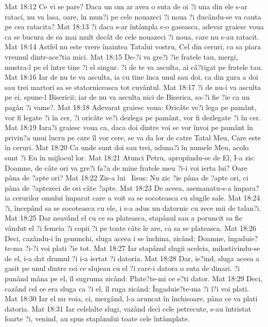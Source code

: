 Mat 18:12  Ce vi se pare? Daca un om ar avea o suta de oi ?i una din ele s-ar rataci, nu va lasa, oare, în mun?i pe cele nouazeci ?i noua ?i ducându-se va cauta pe cea ratacita?
Mat 18:13  ?i daca s-ar întâmpla s-o gaseasca, adevar graiesc voua ca se bucura de ea mai mult decât de cele nouazeci ?i noua, care nu s-au ratacit.
Mat 18:14  Astfel nu este vrere înaintea Tatalui vostru, Cel din ceruri, ca sa piara vreunul dintr-ace?tia mici.
Mat 18:15  De-?i va gre?i ?ie fratele tau, mergi, mustra-l pe el între tine ?i el singur. ?i de te va asculta, ai câ?tigat pe fratele tau.
Mat 18:16  Iar de nu te va asculta, ia cu tine înca unul sau doi, ca din gura a doi sau trei martori sa se statorniceasca tot cuvântul.
Mat 18:17  ?i de nu-i va asculta pe ei, spune-l Bisericii; iar de nu va asculta nici de Biserica, sa-?i fie ?ie ca un pagân ?i vame?.
Mat 18:18  Adevarat graiesc voua: Oricâte ve?i lega pe pamânt, vor fi legate ?i în cer, ?i oricâte ve?i dezlega pe pamânt, vor fi dezlegate ?i în cer.
Mat 18:19  Iara?i graiesc voua ca, daca doi dintre voi se vor învoi pe pamânt în privin?a unui lucru pe care îl vor cere, se va da lor de catre Tatal Meu, Care este în ceruri.
Mat 18:20  Ca unde sunt doi sau trei, aduna?i în numele Meu, acolo sunt ?i Eu în mijlocul lor.
Mat 18:21  Atunci Petru, apropiindu-se de El, I-a zis: Doamne, de câte ori va gre?i fa?a de mine fratele meu ?i-i voi ierta lui? Oare pâna de ?apte ori?
Mat 18:22  Zis-a lui  Iisus: Nu zic ?ie pâna de ?apte ori, ci pâna de ?aptezeci de ori câte ?apte.
Mat 18:23  De aceea, asemanatu-s-a împara?ia cerurilor omului împarat care a voit sa se socoteasca cu slugile sale.
Mat 18:24  ?i, începând sa se socoteasca cu ele, i s-a adus un datornic cu zece mii de talan?i.
Mat 18:25  Dar neavând el cu ce sa plateasca, stapânul sau a poruncit sa fie vândut el ?i femeia ?i copii ?i pe toate câte le are, ca sa se plateasca.
Mat 18:26  Deci, cazându-i în genunchi, sluga aceea i se închina, zicând: Doamne, îngaduie?te-ma ?i-?i voi plati ?ie tot.
Mat 18:27  Iar stapânul slugii aceleia, milostivindu-se de el, i-a dat drumul ?i i-a iertat ?i datoria.
Mat 18:28  Dar, ie?ind, sluga aceea a gasit pe unul dintre cei ce slujeau cu el ?i care-i datora o suta de dinari. ?i punând mâna pe el, îl sugruma zicând: Plate?te-mi ce e?ti dator.
Mat 18:29  Deci, cazând cel ce era sluga ca ?i el, îl ruga zicând: Îngaduie?te-ma ?i î?i voi plati.
Mat 18:30  Iar el nu voia, ci, mergând, l-a aruncat în închisoare, pâna ce va plati datoria.
Mat 18:31  Iar celelalte slugi, vazând deci cele petrecute, s-au întristat foarte ?i, venind, au spus stapânului toate cele întâmplate.
